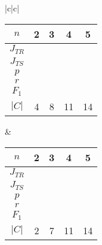\begin{table}[h]
{\begin{tabular}{|c|c|}
\begin{tabular}{c|cccc} 
$n$ & 2 & 3 & 4 & 5 \\ \hline 
\hline 
$J_{TR}$ & \cca{73}{0.73} & \cca{77}{0.77} & \cca{56}{0.57} & \cca{8}{0.08} \\ \hline 
$J_{TS}$ & \cca{82}{0.82} & \cca{74}{0.74} & \cca{42}{0.42} & \cca{3}{0.03} \\ \hline 
$p$ & \cca{88}{0.88} & \cca{80}{0.80} & \cca{59}{0.59} & \cca{6}{0.06} \\ \hline 
$r$ & \cca{93}{0.93} & \cca{91}{0.91} & \cca{61}{0.61} & \cca{32}{0.32} \\ \hline 
$F_1$ & \cca{90}{0.90} & \cca{85}{0.85} & \cca{59}{0.59} & \cca{5}{0.05} \\ \hline \hline 
$|C|$ & 4 & 8 & 11 & 14 \\ 
\end{tabular} 
& 
\begin{tabular}{c|cccc} 
$n$ & 2 & 3 & 4 & 5 \\ \hline 
\hline 
$J_{TR}$ & \cca{79}{0.79} & \cca{81}{0.81} & \cca{81}{0.81} & \cca{14}{0.14} \\ \hline 
$J_{TS}$ & \cca{97}{0.97} & \cca{84}{0.84} & \cca{60}{0.60} & \cca{3}{0.03} \\ \hline 
$p$ & \cca{99}{0.99} & \cca{88}{0.88} & \cca{64}{0.64} & \cca{3}{0.03} \\ \hline 
$r$ & \cca{98}{0.98} & \cca{94}{0.94} & \cca{90}{0.90} & \cca{57}{0.58} \\ \hline 
$F_1$ & \cca{98}{0.98} & \cca{91}{0.91} & \cca{75}{0.75} & \cca{5}{0.05} \\ \hline \hline 
$|C|$ & 2 & 7 & 11 & 14 \\ 
\end{tabular} \\ \hline 
\end{tabular} 
} 
\end{table} 
